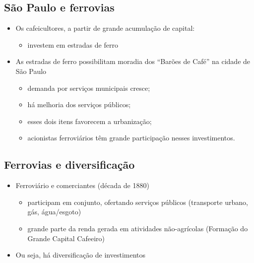 \documentclass[a4paper,12pt]{article}[abntex2]
\begin{document}
\subsection{\textbf{São Paulo e ferrovias}}
\begin{itemize}
    \item  Os cafeicultores, a partir de grande acumulação de capital:
    \begin{itemize}
        \item investem em estradas de ferro
    \end{itemize}
    \item As estradas de ferro possibilitam moradia dos “Barões de Café” na cidade de São Paulo
    \begin{itemize}
        \item demanda por serviços municipais cresce;
    \end{itemize}
    \begin{itemize}
        \item há melhoria dos serviços públicos;
    \end{itemize}
    \begin{itemize}
        \item esses dois itens favorecem a urbanização;
    \end{itemize}
    \begin{itemize}
        \item acionistas ferroviários têm grande participação nesses investimentos.
    \end{itemize}
\end{itemize}
\subsection{\textbf{Ferrovias e diversificação}}
\begin{itemize}
    \item Ferroviário e comerciantes (década de 1880)
    \begin{itemize}
        \item participam em conjunto, ofertando serviços públicos (transporte urbano, gás, água/esgoto)
    \end{itemize}
    \begin{itemize}
        \item grande parte da renda gerada em atividades não-agrícolas (Formação do Grande Capital Cafeeiro)
    \end{itemize}
    \item Ou seja, há diversificação de investimentos
\end{itemize}
\end{document}
